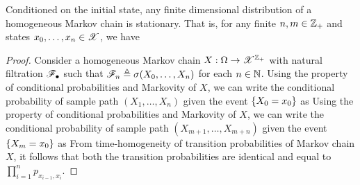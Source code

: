 \documentclass[letterpaper,10pt,english]{article}
\begin{document}
\begin{prop}
Conditioned on the initial state, any finite dimensional distribution of a homogeneous Markov chain is stationary. 
That is, for any finite $n,m \in \mathbb{Z}_+$ and states $x_0, \dots, x_n \in \mathscr{X}$, we have 
\end{prop}
\begin{proof}
Consider a homogeneous Markov chain $X:\Omega\to\mathscr{X}^{\mathbb{Z}_+}$ with natural filtration $\mathscr{F}_\bullet$ such that $\mathscr{F}_n \triangleq \sigma(X_0, \dots, X_n)$ for each $n\in\mathbb{N}$. 
Using the property of conditional probabilities and Markovity of $X$, 
we can write the conditional probability of sample path $(X_1, \dots, X_n)$ given the event $\left\{X_0 = x_0\right\}$ as 
Using the property of conditional probabilities and Markovity of $X$, 
we can write the conditional probability of sample path $(X_{m+1}, \dots, X_{m+n})$ given the event $\left\{X_m = x_0\right\}$ as 
From time-homogeneity of transition probabilities of Markov chain $X$, 
it follows that both the transition probabilities are identical and equal to $\prod_{i=1}^np_{x_{i-1},x_i}$. 
\end{proof}
\end{document}
